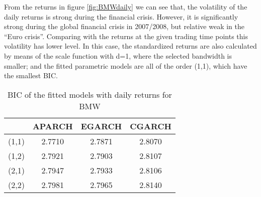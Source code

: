 From the returns in figure \ref{fig:BMWdaily}  we can see that, the volatility of the daily returns is strong during the financial crisis. However, it is significantly strong during the global financial crisis in 2007/2008, but relative weak in the ``Euro crisis''. Comparing with the returns at the given trading time points this volatility has lower level. In this case, the standardized returns are also calculated by means of the scale function with d=1, where the selected bandwidth is smaller; and the fitted parametric models are all of the order (1,1), which have the smallest BIC.



\begin{table}[!h]
 \small
  \centering
  \vspace{2ex} 
\begin{tabular}{c|c|c|c}
\toprule
	 &	APARCH	& EGARCH	& CGARCH \\
\midrule
\hline		 
(1,1) &	2.7710	& 2.7871	& 2.8070 \\
(1,2) &	2.7921	& 2.7903	& 2.8107 \\
(2,1) &	2.7947	& 2.7933	& 2.8106 \\
(2,2) &	2.7981	& 2.7965	& 2.8140 \\
\bottomrule

\end{tabular}
  \caption{BIC of the fitted models with daily returns for BMW}
  \label{tab:dailyBICforBMW}
\end{table}




